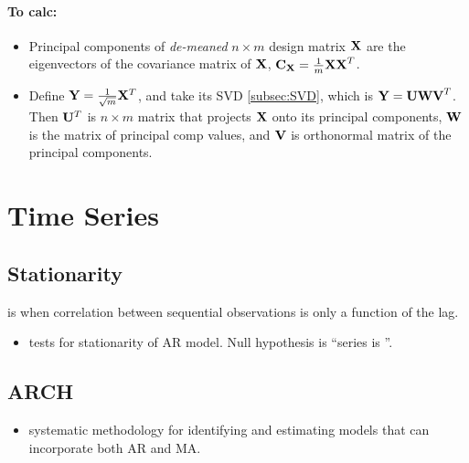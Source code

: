 \documentclass[11pt]{article}
\begin{document}
\paragraph{To calc:}
\begin{itemize}
  \item {} Principal components of \emph{de-meaned}
  $n \times m$ design matrix $\mathbf{X}$ are the eigenvectors of the covariance
  matrix of $\mathbf{X}$, $\mathbf{C_X} = \frac{1}{m}\mathbf{XX}^T$.
  \item {} Define $\mathbf{Y} = \frac{1}{\sqrt{m}}\mathbf{X}^T$, and take
  its SVD \ref{subsec:SVD}, which is $\mathbf{Y} = \mathbf{UWV}^T$. Then $\mathbf{U}^T$
  is $n \times m$ matrix that projects $\mathbf{X}$ onto its principal components,
  $\mathbf{W}$ is the matrix of principal comp values, and $\mathbf{V}$ is orthonormal
  matrix of the principal components. 
\end{itemize}



\section{Time Series}
\label{sec:timeseries}
\subsection{Stationarity}

\begin{definition} is when correlation between
  sequential observations is only a function of the lag.
\end{definition}

\begin{itemize}
  \item {} tests for stationarity of AR model. Null
  hypothesis is ``series is ''.
\end{itemize}

\subsection{ARCH}
\begin{itemize}
  \item{ systematic methodology for identifying and estimating
    models that can incorporate both AR and MA.}
\end{itemize}
\end{document}
